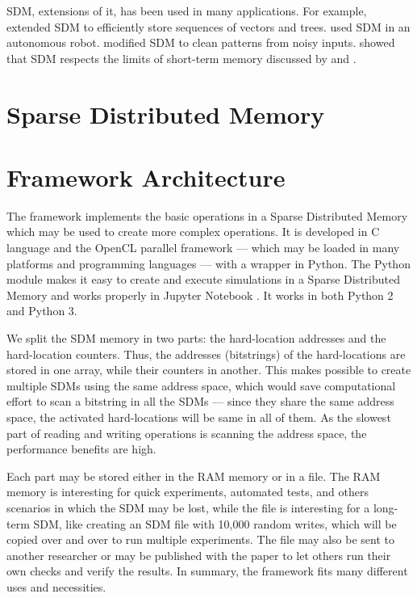 SDM, extensions of it, has been used in many applications. For example, \citet{Snaider2011} extended SDM to efficiently store sequences of vectors and trees.  \citet{Rajesh1998} used SDM in an autonomous robot. \citet{Meng2009} modified SDM to clean patterns from noisy inputs. \citet{Linhares2011} showed that SDM respects the limits of short-term memory discussed by \citet{Miller1955} and \citet{Cowan2001}.

\chapter{Sparse Distributed Memory}




\chapter{Framework Architecture}

The framework implements the basic operations in a Sparse Distributed Memory which may be used to create more complex operations. It is developed in C language and the OpenCL parallel framework --- which may be loaded in many platforms and programming languages --- with a wrapper in Python. The Python module makes it easy to create and execute simulations in a Sparse Distributed Memory and works properly in Jupyter Notebook \citep{kluyver2016jupyter}. It works in both Python 2 and Python 3.

We split the SDM memory in two parts: the hard-location addresses and the hard-location counters. Thus, the addresses (bitstrings) of the hard-locations are stored in one array, while their counters in another. This makes possible to create multiple SDMs using the same address space, which would save computational effort to scan a bitstring in all the SDMs --- since they share the same address space, the activated hard-locations will be same in all of them. As the slowest part of reading and writing operations is scanning the address space, the performance benefits are high.

Each part may be stored either in the RAM memory or in a file. The RAM memory is interesting for quick experiments, automated tests, and others scenarios in which the SDM may be lost, while the file is interesting for a long-term SDM, like creating an SDM file with 10,000 random writes, which will be copied over and over to run multiple experiments. The file may also be sent to another researcher or may be published with the paper to let others run their own checks and verify the results. In summary, the framework fits many different uses and necessities.

